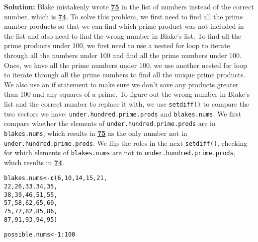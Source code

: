 \documentclass{article}\usepackage[]{graphicx}\usepackage[]{xcolor}
\makeatletter
\newcommand{\hlnum}[1]{\textcolor[rgb]{0.686,0.059,0.569}{#1}}%
\newcommand{\hlopt}[1]{\textcolor[rgb]{0,0,0}{#1}}%
\newcommand{\hldef}[1]{\textcolor[rgb]{0.345,0.345,0.345}{#1}}%
\newcommand{\hlkwb}[1]{\textcolor[rgb]{0.69,0.353,0.396}{#1}}%
\newcommand{\hlkwd}[1]{\textcolor[rgb]{0.737,0.353,0.396}{\textbf{#1}}}%
\newenvironment{kframe}{%
 \def\at@end@of@kframe{}%
 \ifinner\ifhmode%
  \def\at@end@of@kframe{\end{minipage}}%
  \begin{minipage}{\columnwidth}%
 \fi\fi%
 \def\FrameCommand##1{\hskip\@totalleftmargin \hskip-\fboxsep
 \colorbox{shadecolor}{##1}\hskip-\fboxsep
     \hskip-\linewidth \hskip-\@totalleftmargin \hskip\columnwidth}%
 \MakeFramed {\advance\hsize-\width
   \@totalleftmargin\z@ \linewidth\hsize
   \@setminipage}}%
 {\par\unskip\endMakeFramed%
 \at@end@of@kframe}
\newenvironment{knitrout}{}{} %
\makeatother
\begin{document}
\begin{enumerate}
\textbf{Solution:} Blake mistakenly wrote \textbf{\underline{75}} in the list of numbers instead of the correct number, which is \textbf{\underline{74}}. To solve this problem, we first need to find all the prime number products so that we can find which prime product was not included in the list and also need to find the wrong number in Blake's list. To find all the prime products under 100, we first need to use a nested for loop to iterate through all the numbers under 100 and find all the prime numbers under 100. Once, we have all the prime numbers under 100, we use another nested for loop to iterate through all the prime numbers to find all the unique prime products. We also use an if statement to make sure we don't save any products greater than 100 and any squares of a prime. To figure out the wrong number in Blake's list and the correct number to replace it with, we use \texttt{setdiff()} to compare the two vectors we have: \texttt{under.hundred.prime.prods} and \texttt{blakes.nums}. We first compare whether the elements of \texttt{under.hundred.prime.prods} are in \texttt{blakes.nums}, which results in \textbf{\underline{75}} as the only number not in \texttt{under.hundred.prime.prods}. We flip the roles in the next \texttt{setdiff()}, checking for which elements of \texttt{blakes.nums} are not in \texttt{under.hundred.prime.prods}, which results in \textbf{\underline{74}}.



\begin{knitrout}\scriptsize
{}\color{fgcolor}\begin{kframe}
\begin{alltt}
\hldef{blakes.nums} \hlkwb{<-} \hlkwd{c}\hldef{(}\hlnum{6}\hldef{,} \hlnum{10}\hldef{,} \hlnum{14}\hldef{,} \hlnum{15}\hldef{,} \hlnum{21}\hldef{,}
                 \hlnum{22}\hldef{,} \hlnum{26}\hldef{,} \hlnum{33}\hldef{,} \hlnum{34}\hldef{,} \hlnum{35}\hldef{,}
                 \hlnum{38}\hldef{,} \hlnum{39}\hldef{,} \hlnum{46}\hldef{,} \hlnum{51}\hldef{,} \hlnum{55}\hldef{,}
                 \hlnum{57}\hldef{,} \hlnum{58}\hldef{,} \hlnum{62}\hldef{,} \hlnum{65}\hldef{,} \hlnum{69}\hldef{,}
                 \hlnum{75}\hldef{,} \hlnum{77}\hldef{,} \hlnum{82}\hldef{,} \hlnum{85}\hldef{,} \hlnum{86}\hldef{,}
                 \hlnum{87}\hldef{,} \hlnum{91}\hldef{,} \hlnum{93}\hldef{,} \hlnum{94}\hldef{,} \hlnum{95}\hldef{)}

\hldef{possible.nums} \hlkwb{<-} \hlnum{1}\hlopt{:}\hlnum{100}


\end{alltt}
\end{kframe}
\end{knitrout}
\end{enumerate}
\end{document}
